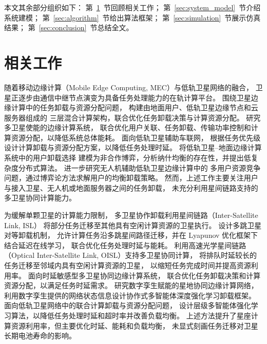 \documentclass[a4paper,11pt]{article}
\begin{document}
本文其余部分组织如下：
第~\ref{sec:related}~节回顾相关工作；
第~\ref{sec:system_model}~节介绍系统建模；
第~\ref{sec:algorithm}~节给出算法框架；
第~\ref{sec:simulation}~节展示仿真结果；
第~\ref{sec:conclusion}~节总结全文。

\section{相关工作}
\label{sec:related}

随着移动边缘计算（Mobile Edge Computing, MEC）与低轨卫星网络的融合，
卫星正逐步由通信中继节点演变为具备任务处理能力的在轨计算平台。
围绕卫星边缘计算中的任务卸载与资源分配问题，
\cite{tang2021hybrid}构建由地面用户、低轨卫星边缘节点和云服务器组成的
三层混合计算架构，联合优化任务卸载决策与计算资源分配。
\cite{ms2024energy}研究多卫星使能的边缘计算系统，
联合优化用户关联、任务卸载、传输功率控制和计算资源分配，以降低系统总体能耗。
\cite{wang2025priority}面向低轨卫星辅助车联网，
根据任务优先级设计计算卸载与资源分配方案，以降低任务处理时延。
\cite{chen2025gdco}将低轨卫星--地面边缘计算系统中的用户卸载选择
建模为非合作博弈，分析纳什均衡的存在性，并提出低复杂度分布式算法。
\cite{chen2025uavgame}进一步研究无人机辅助低轨卫星边缘计算中的
多用户资源竞争问题，通过博弈论方法求解用户的均衡卸载策略。
然而，上述工作主要关注用户与接入卫星、无人机或地面服务器之间的任务卸载，
未充分利用星间链路支持的多卫星协同计算能力。



为缓解单颗卫星的计算能力限制，
多卫星协作卸载利用星间链路（Inter-Satellite Link, ISL）
将部分任务迁移至其他具有空闲计算资源的卫星执行。
\cite{zhang2024mhspo}设计多跳卫星对等卸载机制，
允许计算任务沿多跳星间路径迁移，并在 Lyapunov 优化框架下结合延迟在线学习，
联合优化任务处理时延与能耗。
\cite{zhang2024oisl}利用高速光学星间链路
（Optical Inter-Satellite Link, OISL）支持多卫星协同计算，
将排队时延较长的任务迁移至邻域内具有空闲计算资源的卫星，
以缩短任务完成时间并提高资源利用率。
\cite{li2025dsms}面向时延敏感型多卫星协同边缘计算系统，
联合优化任务卸载决策和计算资源分配，以满足任务时延需求。
\cite{ji2023dtsat}研究数字孪生赋能的星地协同边缘计算网络，
利用数字孪生提供的网络状态信息设计协作式多智能体深度强化学习卸载框架。
\cite{lai2025hmadrl}面向低轨卫星网络中的联合计算卸载与资源分配问题，
设计层级多智能体强化学习算法，以降低任务处理时延和超时率并改善负载均衡。
上述方法提升了星座计算资源利用率，但主要优化时延、能耗和负载均衡，
未显式刻画任务迁移对卫星长期电池寿命的影响。
\end{document}

